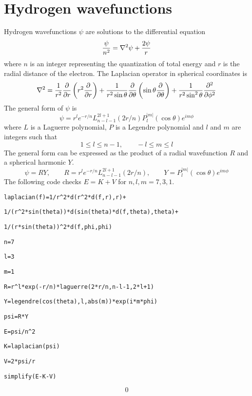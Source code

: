 \section*{Hydrogen wavefunctions}
Hydrogen wavefunctions $\psi$ are solutions to the differential equation
$${\psi\over n^2}=\nabla^2\psi+{2\psi\over r}$$
where $n$ is an integer representing the quantization of total energy and
$r$ is the radial distance of the electron.
The Laplacian operator in spherical coordinates is
$$\nabla^2={1\over r^2}{\partial\over\partial r}
\left(r^2{\partial\over\partial r}\right)
+{1\over r^2\sin\theta}{\partial\over\partial\theta}
\left(\sin\theta{\partial\over\partial\theta}\right)
+{1\over r^2\sin^2\theta}{\partial^2\over\partial\phi^2}$$
The general form of $\psi$ is
$$\psi=r^le^{-r/n}L_{n-l-1}^{2l+1}(2r/n)
P_l^{|m|}(\cos\theta)e^{im\phi}$$
where $L$ is a Laguerre polynomial, $P$ is a Legendre polynomial and
$l$ and $m$ are integers such that
$$1\le l\le n-1,\qquad -l\le m\le l$$
The general form can be expressed as the product of a radial
wavefunction $R$ and a spherical harmonic $Y$.
$$\psi=RY,\qquad R=r^le^{-r/n}L_{n-l-1}^{2l+1}(2r/n),\qquad
Y=P_l^{|m|}(\cos\theta)e^{im\phi}$$
The following code checks $E=K+V$ for $n,l,m=7,3,1$.

\medskip
\verb$laplacian(f)=1/r^2*d(r^2*d(f,r),r)+$

\verb$1/(r^2*sin(theta))*d(sin(theta)*d(f,theta),theta)+$

\verb$1/(r*sin(theta))^2*d(f,phi,phi)$

\verb$n=7$

\verb$l=3$

\verb$m=1$

\verb$R=r^l*exp(-r/n)*laguerre(2*r/n,n-l-1,2*l+1)$

\verb$Y=legendre(cos(theta),l,abs(m))*exp(i*m*phi)$

\verb$psi=R*Y$

\verb$E=psi/n^2$

\verb$K=laplacian(psi)$

\verb$V=2*psi/r$

\verb$simplify(E-K-V)$

$$0$$

